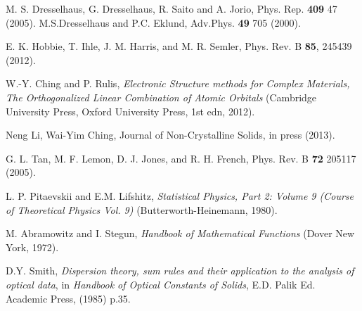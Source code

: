 \documentclass[letterpaper,twocolumn,amsmath,amssymb,floatfix,aps,superscriptaddress]{revtex4}
\begin{document}
\begin{thebibliography}{99}
 M. S. Dresselhaus, G. Dresselhaus, R. Saito and A. Jorio, Phys. Rep.  {\bf 409} 47 (2005). M.S.Dresselhaus and P.C. Eklund, Adv.Phys. {\bf 49} 705 (2000).

 E. K. Hobbie, T. Ihle, J. M. Harris, and M. R. Semler, Phys. Rev. B {\bf 85}, 245439 (2012).

 W.-Y. Ching and P. Rulis, {\sl Electronic Structure methods for Complex Materials, The Orthogonalized Linear Combination of Atomic Orbitals}  (Cambridge University Press, Oxford University Press, 1st edn, 2012).

 Neng Li, Wai-Yim Ching, Journal of Non-Crystalline Solids, in press (2013).

 G. L. Tan, M. F. Lemon, D. J. Jones, and R. H. French, Phys. Rev. B {\bf 72} 205117 (2005).

 L. P. Pitaevskii and E.M. Lifshitz, {\sl Statistical Physics, Part 2: Volume 9 (Course of Theoretical Physics Vol. 9)} (Butterworth-Heinemann, 1980).

 M. Abramowitz and I. Stegun, {\sl Handbook of Mathematical Functions} (Dover New York, 1972).

 D.Y. Smith, {\em Dispersion theory, sum rules and their application to the analysis of optical data}, in {\sl Handbook of Optical Constants of Solids},  E.D. Palik Ed. Academic Press, (1985) p.35.

\end{thebibliography}

\end{document}
